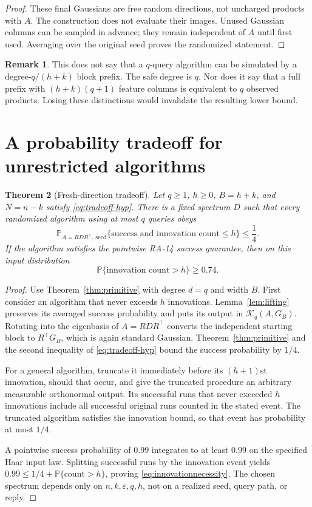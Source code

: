 \documentclass[11pt]{article}
\newtheorem{theorem}{Theorem}[section]
\theoremstyle{definition}
\newtheorem{remark}[theorem]{Remark}
\newcommand{\Prob}{\mathbb P}
\newcommand{\K}{\mathcal K}
\begin{document}
\begin{proof}
These final Gaussians are free random directions, not uncharged products with $A$. The construction does not evaluate their images. Unused Gaussian columns can be sampled in advance; they remain independent of $A$ until first used. Averaging over the original seed proves the randomized statement.
\end{proof}

\begin{remark}
This does not say that a $q$-query algorithm can be simulated by a degree-$q/(h+k)$ block prefix. The safe degree is $q$. Nor does it say that a full prefix with $(h+k)(q+1)$ feature columns is equivalent to $q$ observed products. Losing these distinctions would invalidate the resulting lower bound.
\end{remark}

\section{A probability tradeoff for unrestricted algorithms}\label{sec:tradeoff}
\begin{theorem}[Fresh-direction tradeoff]\label{thm:tradeoff}
Let $q\ge1$, $h\ge0$, $B=h+k$, and $N=n-k$ satisfy \eqref{eq:tradeoff-hyp}. There is a fixed spectrum $D$ such that every randomized algorithm using at most $q$ queries obeys
\[
 \Prob_{A=RDR^\top,\,\text{seed}}
 \{\text{success and innovation count}\le h\}\le\frac14.
\]
If the algorithm satisfies the pointwise RA-14 success guarantee, then on this input distribution
\begin{equation}\label{eq:innovationnecessity}
 \Prob\{\text{innovation count}>h\}\ge0.74.
\end{equation}
\end{theorem}
\begin{proof}
Use Theorem~\ref{thm:primitive} with degree $d=q$ and width $B$. First consider an algorithm that never exceeds $h$ innovations. Lemma~\ref{lem:lifting} preserves its averaged success probability and puts its output in $\K_q(A,G_B)$. Rotating into the eigenbasis of $A=RDR^\top$ converts the independent starting block to $R^\top G_B$, which is again standard Gaussian. Theorem~\ref{thm:primitive} and the second inequality of \eqref{eq:tradeoff-hyp} bound the success probability by $1/4$.

For a general algorithm, truncate it immediately before its $(h+1)$st innovation, should that occur, and give the truncated procedure an arbitrary measurable orthonormal output. Its successful runs that never exceeded $h$ innovations include all successful original runs counted in the stated event. The truncated algorithm satisfies the innovation bound, so that event has probability at most $1/4$.

A pointwise success probability of $0.99$ integrates to at least $0.99$ on the specified Haar input law. Splitting successful runs by the innovation event yields $0.99\le1/4+\Prob\{\text{count}>h\}$, proving \eqref{eq:innovationnecessity}. The chosen spectrum depends only on $n,k,\varepsilon,q,h$, not on a realized seed, query path, or reply.
\end{proof}
\end{document}
